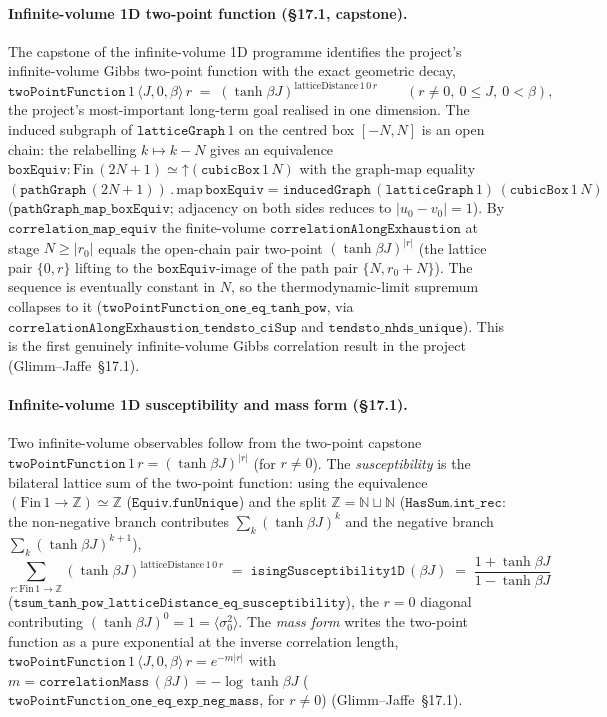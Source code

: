 \documentclass[a4paper,11pt]{article}
\begin{document}
\paragraph{Infinite-volume 1D two-point function (\S17.1, capstone).}
The capstone of the infinite-volume 1D programme identifies the project's
infinite-volume Gibbs two-point function with the exact geometric decay,
\[
  \texttt{twoPointFunction}\,1\,\langle J,0,\beta\rangle\,r
    \;=\; (\tanh\beta J)^{\mathrm{latticeDistance}\,1\,0\,r}
  \qquad (r \ne 0,\ 0 \le J,\ 0 < \beta),
\]
the project's most-important long-term goal realised in one dimension.  The induced
subgraph of $\texttt{latticeGraph}\,1$ on the centred box $[-N,N]$ is an open chain:
the relabelling $k \mapsto k-N$ gives an equivalence
$\texttt{boxEquiv} : \mathrm{Fin}\,(2N{+}1) \simeq \mathord{\uparrow}(\texttt{cubicBox}\,1\,N)$
with the graph-map equality
$(\texttt{pathGraph}\,(2N{+}1))\mathbin{.}\mathrm{map}\,\texttt{boxEquiv}
   = \texttt{inducedGraph}\,(\texttt{latticeGraph}\,1)\,(\texttt{cubicBox}\,1\,N)$
($\texttt{pathGraph\_map\_boxEquiv}$; adjacency on both sides reduces to
$\lvert u_0 - v_0\rvert = 1$).  By $\texttt{correlation\_map\_equiv}$ the finite-volume
$\texttt{correlationAlongExhaustion}$ at stage $N \ge \lvert r_0\rvert$ equals the
open-chain pair two-point $(\tanh\beta J)^{\lvert r\rvert}$ (the lattice pair $\{0,r\}$
lifting to the $\texttt{boxEquiv}$-image of the path pair $\{N, r_0{+}N\}$).  The
sequence is eventually constant in $N$, so the thermodynamic-limit supremum collapses
to it ($\texttt{twoPointFunction\_one\_eq\_tanh\_pow}$, via
$\texttt{correlationAlongExhaustion\_tendsto\_ciSup}$ and $\texttt{tendsto\_nhds\_unique}$).
This is the first genuinely infinite-volume Gibbs correlation result in the project
(Glimm--Jaffe~\S17.1).

\paragraph{Infinite-volume 1D susceptibility and mass form (\S17.1).}
Two infinite-volume observables follow from the two-point capstone
$\texttt{twoPointFunction}\,1\,r = (\tanh\beta J)^{\lvert r\rvert}$ (for $r \ne 0$).  The
\emph{susceptibility} is the bilateral lattice sum of the two-point function: using
the equivalence $(\mathrm{Fin}\,1 \to \mathbb Z) \simeq \mathbb Z$
($\texttt{Equiv.funUnique}$) and the split $\mathbb Z = \mathbb N \sqcup \mathbb N$
($\texttt{HasSum.int\_rec}$: the non-negative branch contributes
$\sum_k (\tanh\beta J)^k$ and the negative branch
$\sum_k (\tanh\beta J)^{k+1}$),
\[
  \sum_{r : \mathrm{Fin}\,1 \to \mathbb Z}
    (\tanh\beta J)^{\mathrm{latticeDistance}\,1\,0\,r}
  \;=\; \texttt{isingSusceptibility1D}\,(\beta J)
  \;=\; \frac{1+\tanh\beta J}{1-\tanh\beta J}
\]
($\texttt{tsum\_tanh\_pow\_latticeDistance\_eq\_susceptibility}$), the $r = 0$
diagonal contributing $(\tanh\beta J)^0 = 1 = \langle\sigma_0^2\rangle$.  The
\emph{mass form} writes the two-point function as a pure exponential at the inverse
correlation length, $\texttt{twoPointFunction}\,1\,\langle J,0,\beta\rangle\,r
   = e^{-m\lvert r\rvert}$ with $m = \texttt{correlationMass}\,(\beta J)
   = -\log\tanh\beta J$
($\texttt{twoPointFunction\_one\_eq\_exp\_neg\_mass}$, for $r \ne 0$)
(Glimm--Jaffe~\S17.1).
\end{document}
